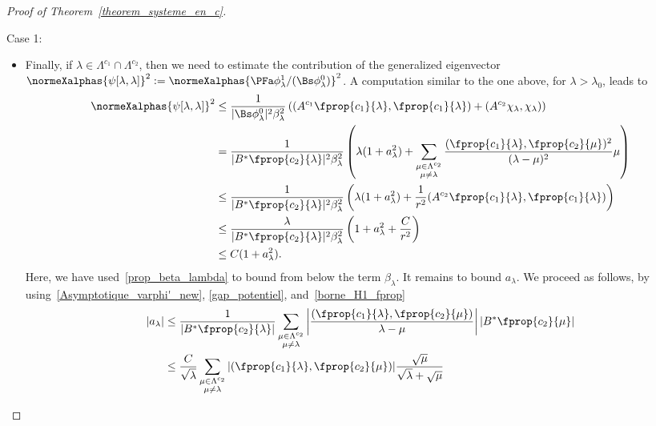 \begin{proof}[Proof of Theorem~\ref{theorem_systeme_en_c}]
\begin{step}{Case 1:}
\begin{itemize}
Using Parseval's identity, \eqref{borne_H1_fprop} and then~\eqref{ABM_xi_lambda}, we finally obtain
\begin{align*}
\normeXalphas{\psi[\lambda]}^2 & \leq \frac{1}{|B^* \xi_\lambda|^2} \left(\lambda + \frac{1}{r^2} (\fprop{c_1}{\lambda}, A^{c_2}\fprop{c_1}{\lambda}) \right) \\
& \leq \frac{\lambda}{|B^* \xi_\lambda|^2} \left(1 + \frac{C}{r^2}\right)\\
& \leq C.
\end{align*}

\item Finally, if $\lambda\in \Lambda^{c_1}\cap \Lambda^{c_2}$, then we need to estimate the contribution of the generalized eigenvector $\normeXalphas{\psi[\lambda,\lambda]}^2:=\normeXalphas{\PFa \phi_\lambda^1/(\Bs \phi_\lambda^0)}^2$. A computation similar to the one above, for $\lambda > \lambda_0$, leads to
\begin{align*}
\normeXalphas{\psi[\lambda,\lambda]}^2& \leq \frac{1}{|\Bs \phi_\lambda^0|^2 \beta_\lambda^2} \left((A^{c_1} \fprop{c_1}{\lambda},\fprop{c_1}{\lambda}) + (A^{c_2} \chi_\lambda,\chi_\lambda) \right) \\
& = \frac{1}{|B^* \fprop{c_2}{\lambda}|^2 \beta_\lambda^2} \left(\lambda (1+a_\lambda^2) + \sum_{\substack{\mu \in \Lambda^{c_2}\\ \mu\neq \lambda}} \frac{(\fprop{c_1}{\lambda},\fprop{c_2}{\mu})^2}{(\lambda-\mu)^2} \mu \right)\\
& \leq \frac{1}{|B^* \fprop{c_2}{\lambda}|^2 \beta_\lambda^2} \left(\lambda (1+a_\lambda^2) + \frac{1}{r^2} (A^{c_2}\fprop{c_1}{\lambda},\fprop{c_1}{\lambda}) \right)\\
& \leq \frac{\lambda}{|B^* \fprop{c_2}{\lambda}|^2 \beta_\lambda^2} \left(1+a_\lambda^2 + \frac{C}{r^2} \right)\\
& \leq C (1+a_\lambda^2).
\end{align*}
Here, we have used~\eqref{prop_beta_lambda} to bound from below the term $\beta_\lambda$. It remains to bound $a_\lambda$. We proceed as follows, by using~\eqref{Asymptotique_varphi'_new}, \eqref{gap_potentiel}, and~\eqref{borne_H1_fprop}
\begin{align*}
|a_\lambda| & \leq \frac{1}{|B^* \fprop{c_2}{\lambda}|} \sum_{\substack{\mu\in \Lambda^{c_2}\\ \mu \neq \lambda}} \left| \frac{(\fprop{c_1}{\lambda},\fprop{c_2}{\mu})}{\lambda-\mu}\right| |B^* \fprop{c_2}{\mu}| \\
& \leq \frac{C}{\sqrt{\lambda}} \sum_{\substack{\mu\in \Lambda^{c_2}\\ \mu \neq \lambda}} |(\fprop{c_1}{\lambda},\fprop{c_2}{\mu})| \frac{\sqrt{\mu}}{\sqrt{\lambda}+\sqrt{\mu}} \\

\end{align*}
\end{itemize}
\end{step}
\end{proof}
